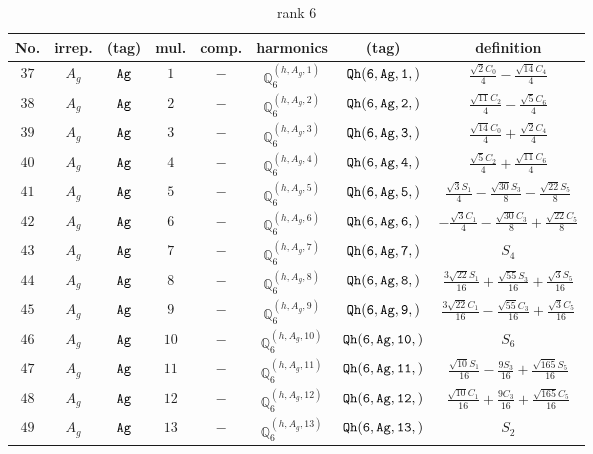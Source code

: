 \documentclass[fleqn,8pt]{jsarticle}
\begin{document}
\begin{table}[ht!]
\begin{center}
\caption{rank 6}
\renewcommand{\arraystretch}{1.3}
\begin{tabular}{cccccccc} \hline \hline
No. & irrep. & (tag) & mul. & comp. & harmonics & (tag) & definition \\ \hline
$ 37 $ & $ A_{g} $ & $ {\tt Ag} $ & $ 1 $ & $ - $ & $ \mathbb{Q}_{6}^{(h,A_{g},1)} $ & $ {\tt Qh(6,Ag,1,)} $ & $ \frac{\sqrt{2} C_{0}}{4} - \frac{\sqrt{14} C_{4}}{4} $ \\
$ 38 $ & $ A_{g} $ & $ {\tt Ag} $ & $ 2 $ & $ - $ & $ \mathbb{Q}_{6}^{(h,A_{g},2)} $ & $ {\tt Qh(6,Ag,2,)} $ & $ \frac{\sqrt{11} C_{2}}{4} - \frac{\sqrt{5} C_{6}}{4} $ \\
$ 39 $ & $ A_{g} $ & $ {\tt Ag} $ & $ 3 $ & $ - $ & $ \mathbb{Q}_{6}^{(h,A_{g},3)} $ & $ {\tt Qh(6,Ag,3,)} $ & $ \frac{\sqrt{14} C_{0}}{4} + \frac{\sqrt{2} C_{4}}{4} $ \\
$ 40 $ & $ A_{g} $ & $ {\tt Ag} $ & $ 4 $ & $ - $ & $ \mathbb{Q}_{6}^{(h,A_{g},4)} $ & $ {\tt Qh(6,Ag,4,)} $ & $ \frac{\sqrt{5} C_{2}}{4} + \frac{\sqrt{11} C_{6}}{4} $ \\
$ 41 $ & $ A_{g} $ & $ {\tt Ag} $ & $ 5 $ & $ - $ & $ \mathbb{Q}_{6}^{(h,A_{g},5)} $ & $ {\tt Qh(6,Ag,5,)} $ & $ \frac{\sqrt{3} S_{1}}{4} - \frac{\sqrt{30} S_{3}}{8} - \frac{\sqrt{22} S_{5}}{8} $ \\
$ 42 $ & $ A_{g} $ & $ {\tt Ag} $ & $ 6 $ & $ - $ & $ \mathbb{Q}_{6}^{(h,A_{g},6)} $ & $ {\tt Qh(6,Ag,6,)} $ & $ - \frac{\sqrt{3} C_{1}}{4} - \frac{\sqrt{30} C_{3}}{8} + \frac{\sqrt{22} C_{5}}{8} $ \\
$ 43 $ & $ A_{g} $ & $ {\tt Ag} $ & $ 7 $ & $ - $ & $ \mathbb{Q}_{6}^{(h,A_{g},7)} $ & $ {\tt Qh(6,Ag,7,)} $ & $ S_{4} $ \\
$ 44 $ & $ A_{g} $ & $ {\tt Ag} $ & $ 8 $ & $ - $ & $ \mathbb{Q}_{6}^{(h,A_{g},8)} $ & $ {\tt Qh(6,Ag,8,)} $ & $ \frac{3 \sqrt{22} S_{1}}{16} + \frac{\sqrt{55} S_{3}}{16} + \frac{\sqrt{3} S_{5}}{16} $ \\
$ 45 $ & $ A_{g} $ & $ {\tt Ag} $ & $ 9 $ & $ - $ & $ \mathbb{Q}_{6}^{(h,A_{g},9)} $ & $ {\tt Qh(6,Ag,9,)} $ & $ \frac{3 \sqrt{22} C_{1}}{16} - \frac{\sqrt{55} C_{3}}{16} + \frac{\sqrt{3} C_{5}}{16} $ \\
$ 46 $ & $ A_{g} $ & $ {\tt Ag} $ & $ 10 $ & $ - $ & $ \mathbb{Q}_{6}^{(h,A_{g},10)} $ & $ {\tt Qh(6,Ag,10,)} $ & $ S_{6} $ \\
$ 47 $ & $ A_{g} $ & $ {\tt Ag} $ & $ 11 $ & $ - $ & $ \mathbb{Q}_{6}^{(h,A_{g},11)} $ & $ {\tt Qh(6,Ag,11,)} $ & $ \frac{\sqrt{10} S_{1}}{16} - \frac{9 S_{3}}{16} + \frac{\sqrt{165} S_{5}}{16} $ \\
$ 48 $ & $ A_{g} $ & $ {\tt Ag} $ & $ 12 $ & $ - $ & $ \mathbb{Q}_{6}^{(h,A_{g},12)} $ & $ {\tt Qh(6,Ag,12,)} $ & $ \frac{\sqrt{10} C_{1}}{16} + \frac{9 C_{3}}{16} + \frac{\sqrt{165} C_{5}}{16} $ \\
$ 49 $ & $ A_{g} $ & $ {\tt Ag} $ & $ 13 $ & $ - $ & $ \mathbb{Q}_{6}^{(h,A_{g},13)} $ & $ {\tt Qh(6,Ag,13,)} $ & $ S_{2} $ \\
 \hline \hline
\end{tabular}
\end{center}
\end{table}
\end{document}
